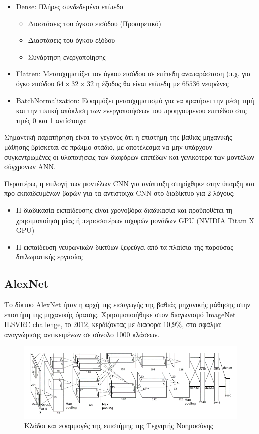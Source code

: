 \begin{itemize}
  \item{Dense: Πλήρες συνδεδεμένο επίπεδο}
    \begin{itemize}
      \item{Διαστάσεις του όγκου εισόδου (Προαιρετικό)}
      \item{Διαστάσεις του όγκου εξόδου}
      \item{Συνάρτηση ενεργοποίησης}
    \end{itemize}
  \item{Flatten: Μετασχηματίζει τον όγκου εισόδου σε επίπεδη αναπαράσταση
    (π.χ. για όγκο εισόδου $64 \times 32 \times 32$ η έξοδος θα είναι επίπεδη με $65536$ νευρώνες}
  \item{BatchNormalization: Εφαρμόζει μετασχηματισμό για να κρατήσει την μέση τιμή
      και την τυπική απόκλιση των ενεργοποιήσεων του προηγούμενου επιπέδου στις τιμές 0 και 1 αντίστοιχα}
\end{itemize}

Σημαντική παρατήρηση είναι το γεγονός ότι η επιστήμη της βαθιάς μηχανικής μάθησης
βρίσκεται σε πρώιμο στάδιο, με αποτέλεσμα να μην υπάρχουν συγκεντρωμένες
οι υλοποιήσεις των διαφόρων επιπέδων και γενικότερα των μοντέλων σύγχρονων ΑNN.

Περαιτέρω, η επιλογή των μοντέλων CNN για ανάπτυξη στηρίχθηκε στην ύπαρξη και
προ-εκπαιδευμένων βαρών για τα αντίστοιχα CNN στο διαδίκτυο για 2 λόγους:
\begin{itemize}
  \item{Η διαδικασία εκπαίδευσης είναι χρονοβόρα διαδικασία και προϋποθέτει
    τη χρησιμοποίηση μίας ή περισσοτέρων ισχυρών μονάδων GPU (NVIDIA Titam X GPU)}
  \item{Η εκπαίδευση νευρωνικών δικτύων ξεφεύγει από τα πλαίσια της παρούσας
    διπλωματικής εργασίας}
\end{itemize}


\subsection{AlexNet}

Το δίκτυο AlexNet ήταν η αρχή της εισαγωγής της βαθιάς
μηχανικής μάθησης στην επιστήμη της μηχανικής όρασης. Χρησιμοποιήθηκε
στον διαγωνισμό ImageNet ILSVRC challenge, το 2012, κερδίζοντας με διαφορά
10,9\%, στο σφάλμα αναγνώρισης αντικειμένων σε σύνολο 1000 κλάσεων.

\begin{figure}[!ht]
  \centering
  \includegraphics[width=1\textwidth]{./images/chapter5/alexnet_from_paper.png}
  \caption[Κλάδοι και εφαρμογές της επιστήμης της Τεχνητής Νοημοσύνης]{Κλάδοι και εφαρμογές της επιστήμης της Τεχνητής Νοημοσύνης}
  \label{fig:ai_1}
\end{figure}

